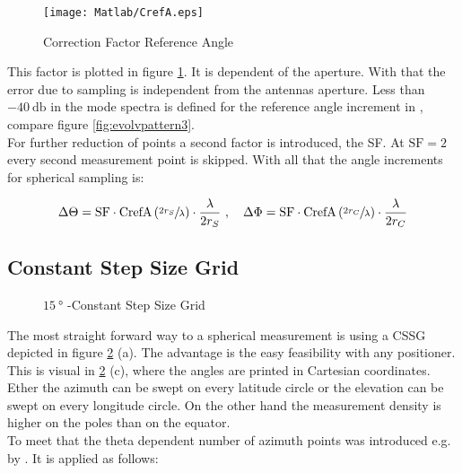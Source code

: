 \begin{figure}
\centering
\texttt{[image: Matlab/CrefA.eps]}
\caption{Correction Factor Reference Angle}
\label{fig:crefa}
\end{figure}

This factor is plotted in figure \ref{fig:crefa}. It is dependent of the aperture. With that the error due to sampling is independent from the antennas aperture. Less than $\SI{-40}{\decibel}$ in the mode spectra is defined for the reference angle increment in \cite{2018arXiv180310993F}, compare figure \ref{fig:evolvpattern3}.\\
For further reduction of points a second factor is introduced, the \acf{SF}. At $\text{SF}=2$ every second measurement point is skipped. With all that the angle increments for spherical sampling is:

\begin{equation}
\Delta\Theta = \text{SF}\cdot\text{CrefA}\left(\sfrac{2r_S}{\lambda}\right)\cdot\frac{\lambda}{2r_S}\ ,\quad\Delta\Phi = \text{SF}\cdot\text{CrefA}\left(\sfrac{2r_C}{\lambda}\right)\cdot\frac{\lambda}{2r_C}
\label{eq:angle}
\end{equation}

\subsection{Constant Step Size Grid}


\begin{figure}[h]
  \centering
  \centering
  \centering
  \centering
\caption{$\SI{15}{\degree}$ -Constant Step Size Grid}
\label{fig:cssg}
\end{figure}

The most straight forward way to a spherical measurement is using a \ac{CSSG} depicted in figure \ref{fig:cssg} (a). The advantage is the easy feasibility with any positioner. This is visual in \ref{fig:cssg} (c), where the angles are printed in Cartesian coordinates. Ether the azimuth can be swept on every latitude circle or the elevation can be swept on every longitude circle. On the other hand the measurement density is higher on the poles than on the equator.\\
To meet that the theta dependent number of azimuth points was introduced e.g. by \cite{ctiaat}. It is applied as follows:

